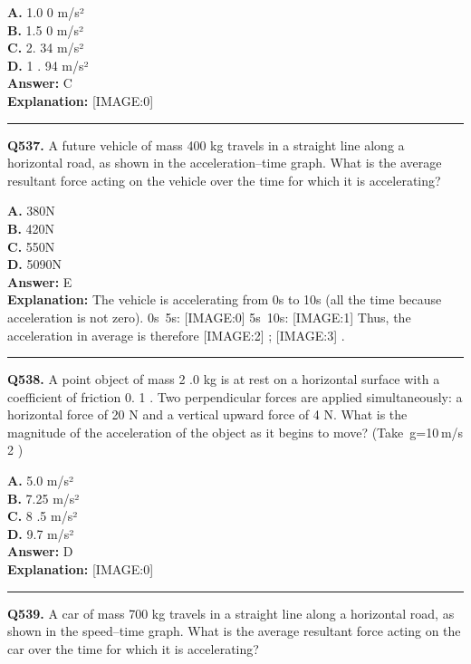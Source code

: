 \documentclass[12pt]{article}
\begin{document}
\textbf{A.} 1.0
0
m/s² \\
\textbf{B.} 1.5
0
m/s² \\
\textbf{C.} 2.
34
m/s² \\
\textbf{D.} 1
.
94
m/s² \\

\textbf{Answer:} C \\
\textbf{Explanation:} [IMAGE:0]

\hrule
\vspace{1em}


\noindent
\textbf{Q537.} A future vehicle of mass 400 kg travels in a straight line along a horizontal road, as shown in the acceleration–time graph.
What is the average resultant force acting on the vehicle over the time for which it is accelerating?



\textbf{A.} 380N \\
\textbf{B.} 420N \\
\textbf{C.} 550N \\
\textbf{D.} 5090N \\

\textbf{Answer:} E \\
\textbf{Explanation:} The vehicle is accelerating from 0s to 10s (all the time because acceleration is not zero).
0s~5s:
[IMAGE:0]
5s~10s:
[IMAGE:1]
Thus, the acceleration in average is therefore
[IMAGE:2]
;
[IMAGE:3]
.

\hrule
\vspace{1em}


\noindent
\textbf{Q538.} A point object of mass 2
.0 kg is at rest on a horizontal surface with a coefficient of friction 0.
1
. Two perpendicular forces are applied simultaneously: a horizontal force of 20 N and a vertical upward force of 4 N. What is the magnitude of the acceleration of the object as it begins to move? (Take g=10 m/s
2
)



\textbf{A.} 5.0 m/s² \\
\textbf{B.} 7.25 m/s² \\
\textbf{C.} 8
.5 m/s² \\
\textbf{D.} 9.7
m/s² \\

\textbf{Answer:} D \\
\textbf{Explanation:} [IMAGE:0]

\hrule
\vspace{1em}


\noindent
\textbf{Q539.} A car of mass 700 kg travels in a straight line along a horizontal road, as shown in the speed–time graph.
What is the average resultant force acting on the car over the time for which it is accelerating?
\end{document}
